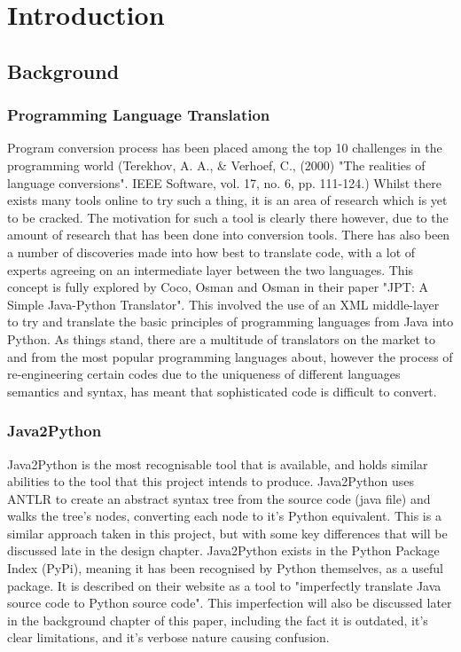\documentclass{l4proj}
\begin{document}
\chapter{Introduction}



\section{Background}
\subsection{Programming Language Translation}
 Program conversion process has been placed  among  the  top  10  challenges  in  the  programming  world  (Terekhov, A. A., & Verhoef, C., (2000) "The realities of language conversions". IEEE  Software,  vol. 17, no. 6, pp. 111-124.) Whilst there exists many tools online to try such a thing, it is an area of research which is yet to be cracked. The motivation for such a tool is clearly there however, due to the amount of research that has been done into conversion tools. There has also been a number of discoveries made into how best to translate code, with a lot of experts agreeing on an intermediate layer between the two languages. This concept is fully explored by Coco, Osman and Osman in their paper "JPT: A Simple Java-Python Translator". This involved the use of an XML middle-layer to try and translate the basic principles of programming languages from Java into Python. As things stand, there are a multitude of translators on the market to and from the most popular programming languages about, however the process of re-engineering certain codes due to the uniqueness of different languages semantics and syntax, has meant that sophisticated code is difficult to convert. 
 
\subsection{Java2Python}
Java2Python is the most recognisable tool that is available, and holds similar abilities to the tool that this project intends to produce. Java2Python uses ANTLR to create an abstract syntax tree from the source code (java file) and walks the tree's nodes, converting each node to it's Python equivalent. This is a similar approach taken in this project, but with some key differences that will be discussed late in the design chapter. Java2Python exists in the Python Package Index (PyPi), meaning it has been recognised by Python themselves, as a useful package. It is described on their website as a tool to "imperfectly translate Java source code to Python source code". This imperfection will also be discussed later in the background chapter of this paper, including the fact it is outdated, it's clear limitations, and it's verbose nature causing confusion.
\end{document}
